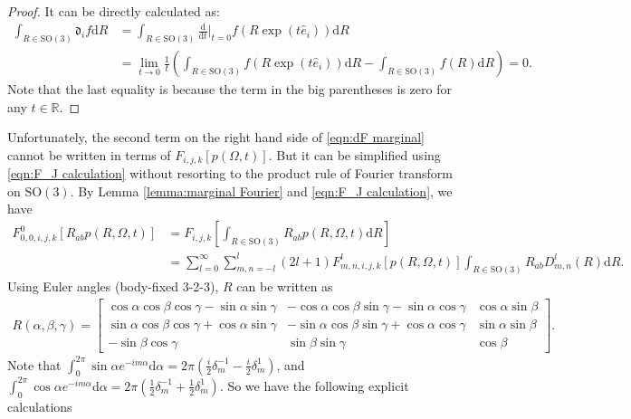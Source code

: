 \documentclass[10pt]{article}
\newcommand{\SO}{\ensuremath{\mathrm{SO}(3)}}
\newcommand{\diff}[1]{\mathrm{d}#1}
\newcommand{\liediff}{\mathfrak{d}}
\newcommand{\real}{\ensuremath{\mathbb{R}}}
\begin{document}
\begin{proof}
	It can be directly calculated as:
	\begin{align*}
		\int_{R\in\SO} \liediff_i f\diff{R} &= \int_{R\in\SO} \frac{\diff{}}{\diff{t}} \bigg\lvert_{t=0} f(R\exp(t\hat{e}_i)) \diff{R} \\
		&= \lim\limits_{t\to 0} \frac{1}{t} \left( \int_{R\in\SO} f(R\exp(t\hat{e}_i)) \diff{R} - \int_{R\in\SO} f(R) \diff{R} \right) = 0.
	\end{align*}
	Note that the last equality is because the term in the big parentheses is zero for any $t\in\real$.
\end{proof}

Unfortunately, the second term on the right hand side of \eqref{eqn:dF marginal} cannot be written in terms of $F_{i,j,k}[p(\Omega,t)]$.
But it can be simplified using \eqref{eqn:F_J calculation} without resorting to the product rule of Fourier transform on $\SO$.
By Lemma \ref{lemma:marginal Fourier} and \eqref{eqn:F_J calculation}, we have
\begin{align*}
	F^0_{0,0,i,j,k}[R_{ab}p(R,\Omega,t)] &= F_{i,j,k}\left[ \int_{R\in\SO} R_{ab}p(R,\Omega,t) \diff{R} \right] \\
	&= \sum_{l=0}^\infty \sum_{m,n=-l}^l (2l+1) F^l_{m,n,i,j,k}[p(R,\Omega,t)] \int_{R\in\SO} R_{ab}D^l_{m,n}(R) \diff{R}.
\end{align*}
Using Euler angles (body-fixed 3-2-3), $R$ can be written as
\begin{align}
	R(\alpha,\beta,\gamma) = \begin{bmatrix}
		\cos\alpha\cos\beta\cos\gamma-\sin\alpha\sin\gamma & -\cos\alpha\cos\beta\sin\gamma-\sin\alpha\cos\gamma & \cos\alpha\sin\beta \\
		\sin\alpha\cos\beta\cos\gamma+\cos\alpha\sin\gamma & -\sin\alpha\cos\beta\sin\gamma+\cos\alpha\cos\gamma & \sin\alpha\sin\beta \\
		-\sin\beta\cos\gamma & \sin\beta\sin\gamma & \cos\beta
	\end{bmatrix}.
\end{align}
Note that $\int_0^{2\pi}\sin\alpha e^{-im\alpha} \diff{\alpha} = 2\pi\left( \frac{i}{2}\delta_m^{-1} - \frac{i}{2}\delta_m^1 \right)$, and $\int_0^{2\pi}\cos\alpha e^{-im\alpha} \diff{\alpha} = 2\pi\left( \frac{1}{2}\delta_m^{-1} + \frac{1}{2}\delta_m^1 \right)$.
So we have the following explicit calculations
\end{document}
